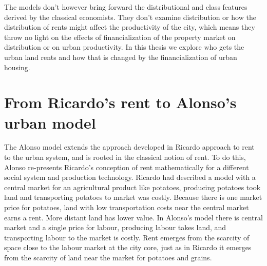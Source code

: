 The models don't however bring forward the distributional and class features derived by the classical economists. They don't examine distribution or how the distribution of rents might affect the productivity of the city, which means they throw no light on the effects of financialization of the property market on distribution or on urban productivity. 
In this thesis we  explore who gets the urban land rents and how that is changed by the financialization of urban housing.









\section{From Ricardo's rent to Alonso's urban model}
The Alonso model extends the approach developed in Ricardo approach to rent to the urban system, and is rooted in the classical notion of rent. To do this, Alonso re-presents Ricardo's conception of rent mathematically for a different social system and production technology. Ricardo had described a model with a central market for an agricultural product like potatoes, producing potatoes took land and transporting potatoes to market was costly. Because there is one market price for potatoes, land with low transportation costs near the central market earns a rent. More distant land has lower value. In Alonso's model there is central market and a single price for labour, producing labour takes land, and transporting labour to the market is costly. Rent emerges from the scarcity of space close to the labour market at the city core, just as  in Ricardo it emerges from the scarcity of land near the market for potatoes and grains. 


